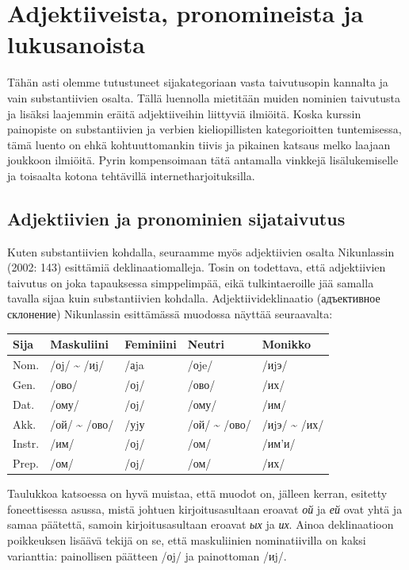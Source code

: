 \documentclass[]{scrreprt}
\begin{document}
\chapter{Adjektiiveista, pronomineista ja
lukusanoista}\label{luento-6-adjektiiveista-pronomineista-ja-lukusanoista}


Tähän asti olemme tutustuneet sijakategoriaan vasta taivutusopin
kannalta ja vain substantiivien osalta. Tällä luennolla mietitään muiden
nominien taivutusta ja lisäksi laajemmin eräitä adjektiiveihin liittyviä
ilmiöitä. Koska kurssin painopiste on substantiivien ja verbien
kieliopillisten kategorioitten tuntemisessa, tämä luento on ehkä
kohtuuttomankin tiivis ja pikainen katsaus melko laajaan joukkoon
ilmiöitä. Pyrin kompensoimaan tätä antamalla vinkkejä lisälukemiselle ja
toisaalta kotona tehtävillä internetharjoituksilla.

\section{Adjektiivien ja pronominien
sijataivutus}\label{adjektiivien-ja-pronominien-sijataivutus}

Kuten substantiivien kohdalla, seuraamme myös adjektiivien osalta
Nikunlassin (2002: 143) esittämiä deklinaatiomalleja. Tosin on
todettava, että adjektiivien taivutus on joka tapauksessa simppelimpää,
eikä tulkintaeroille jää samalla tavalla sijaa kuin substantiivien
kohdalla. Adjektiivideklinaatio (адъективное склонение) Nikunlassin
esittämässä muodossa näyttää seuraavalta:

\begin{longtable}[c]{@{}lllll@{}}
\toprule
Sija & Maskuliini & Feminiini & Neutri & Monikko\tabularnewline
\midrule
\endhead
Nom. & /оj/ \textasciitilde{} /иj/ & /аja & /оje/ & /иjэ/\tabularnewline
Gen. & /ово/ & /оj/ & /ово/ & /их/\tabularnewline
Dat. & /ому/ & /оj/ & /ому/ & /им/\tabularnewline
Akk. & /ой/ \textasciitilde{} /ово/ & /уjу & /ой/ \textasciitilde{}
/ово/ & /иjэ/ \textasciitilde{} /их/\tabularnewline
Instr. & /им/ & /оj/ & /ом/ & /им'и/\tabularnewline
Prep. & /ом/ & /оj/ & /ом/ & /их/\tabularnewline
\bottomrule
\end{longtable}

Taulukkoa katsoessa on hyvä muistaa, että muodot on, jälleen kerran,
esitetty foneettisessa asussa, mistä johtuen kirjoitusasultaan eroavat
\emph{ой} ja \emph{ей} ovat yhtä ja samaa päätettä, samoin
kirjoitusasultaan eroavat \emph{ых} ja \emph{их}. Ainoa deklinaatioon
poikkeuksen lisäävä tekijä on se, että maskuliinien nominatiivilla on
kaksi varianttia: painollisen päätteen /оj/ ja painottoman /иj/.
\end{document}
